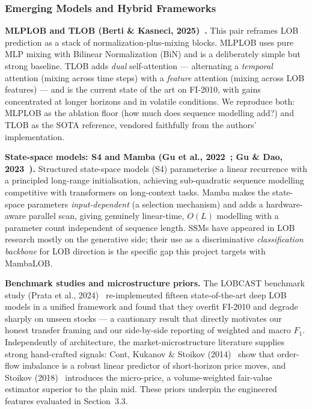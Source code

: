 \documentclass[11pt]{article}
\begin{document}
\subsubsection{Emerging Models and Hybrid Frameworks}
\noindent\textbf{MLPLOB and TLOB (Berti \& Kasneci, 2025)~\cite{tlob}.} This pair reframes LOB prediction as
a stack of normalization-plus-mixing blocks. MLPLOB uses pure MLP mixing with Bilinear Normalization (BiN)
and is a deliberately simple but strong baseline. TLOB adds \emph{dual} self-attention --- alternating a
\emph{temporal} attention (mixing across time steps) with a \emph{feature} attention (mixing across LOB
features) --- and is the current state of the art on FI-2010, with gains concentrated at longer horizons and
in volatile conditions. We reproduce both: MLPLOB as the ablation floor (how much does sequence modelling
add?) and TLOB as the SOTA reference, vendored faithfully from the authors' implementation.

\noindent\textbf{State-space models: S4 and Mamba (Gu et al., 2022~\cite{s4}; Gu \& Dao, 2023~\cite{mamba}).}
Structured state-space models (S4) parameterise a linear recurrence with a principled long-range
initialisation, achieving sub-quadratic sequence modelling competitive with transformers on long-context
tasks. Mamba makes the state-space parameters \emph{input-dependent} (a selection mechanism) and adds a
hardware-aware parallel scan, giving genuinely linear-time, $O(L)$ modelling with a parameter count
independent of sequence length. SSMs have appeared in LOB research mostly on the generative side; their use
as a discriminative \emph{classification backbone} for LOB direction is the specific gap this project
targets with MambaLOB.

\noindent\textbf{Benchmark studies and microstructure priors.} The LOBCAST benchmark study
(Prata et al., 2024)~\cite{lobcast} re-implemented fifteen state-of-the-art deep LOB models in a unified
framework and found that they overfit FI-2010 and degrade sharply on unseen stocks --- a cautionary result
that directly motivates our honest transfer framing and our side-by-side reporting of weighted and macro
$F_1$. Independently of architecture, the market-microstructure literature supplies strong hand-crafted
signals: Cont, Kukanov \& Stoikov (2014)~\cite{ofi} show that order-flow imbalance is a robust linear
predictor of short-horizon price moves, and Stoikov (2018)~\cite{microprice} introduces the micro-price, a
volume-weighted fair-value estimator superior to the plain mid. These priors underpin the engineered features
evaluated in Section~3.3.
\end{document}
